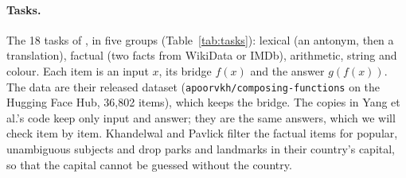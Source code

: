 \documentclass[10pt,a4paper]{article}
\begin{document}
\paragraph{Tasks.} The 18 tasks of \citet[Table~1]{khandelwal2026compose}, in five groups (Table~\ref{tab:tasks}): lexical (an antonym, then a translation), factual (two facts from WikiData or IMDb), arithmetic, string and colour. Each item is an input $x$, its bridge $f(x)$ and the answer $g(f(x))$. The data are their released dataset (\texttt{apoorvkh/composing-functions} on the Hugging Face Hub, 36{,}802 items), which keeps the bridge. The copies in Yang et al.'s code keep only input and answer; they are the same answers, which we will check item by item. Khandelwal and Pavlick filter the factual items for popular, unambiguous subjects and drop parks and landmarks in their country's capital, so that the capital cannot be guessed without the country.
\end{document}
